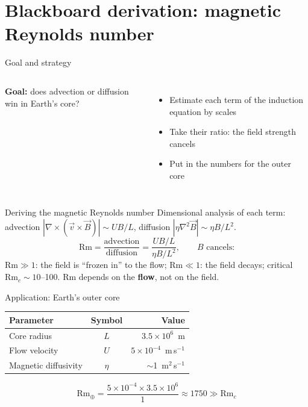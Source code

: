 \documentclass[aspectratio=169, 11pt]{beamer}
\begin{document}
\section{Blackboard derivation: magnetic Reynolds number}

\begin{frame}{Goal and strategy}
  \begin{columns}[c]
    \column{\recapfigcolnarrow}
    \column{\recaptextcolwide}
    \textbf{Goal:} does advection or diffusion win in Earth's core?
    \vskip8pt
    \begin{itemize}\setlength\itemsep{2pt}
      \item Estimate each term of the induction equation by scales
      \item Take their ratio: the field strength cancels
      \item Put in the numbers for the outer core
    \end{itemize}
    \vskip8pt
  \end{columns}
\end{frame}

\begin{frame}{Deriving the magnetic Reynolds number}
  Dimensional analysis of each term: advection $|\nabla \times (\vec{v} \times \vec{B})| \sim UB/L$, diffusion $|\eta \nabla^2 \vec{B}| \sim \eta B/L^2$.
  $$\mathrm{Rm} = \frac{\text{advection}}{\text{diffusion}} = \frac{UB/L}{\eta B/L^2}, \qquad B \text{ cancels:}$$
  \vskip4pt
  $\mathrm{Rm} \gg 1$: the field is ``frozen in'' to the flow; $\mathrm{Rm} \ll 1$: the field decays; critical $\mathrm{Rm}_c \sim 10$--100. Rm depends on the \textbf{flow}, not on the field.
\end{frame}

\begin{frame}{Application: Earth's outer core}
  \centering
  \begin{tabular}{l c r}
    \toprule
    \textbf{Parameter} & \textbf{Symbol} & \textbf{Value} \\
    \midrule
    Core radius & $L$ & $3.5 \times 10^6$~m \\
    Flow velocity & $U$ & $5 \times 10^{-4}$~m\,s$^{-1}$ \\
    Magnetic diffusivity & $\eta$ & $\sim$1~m$^2$\,s$^{-1}$ \\
    \bottomrule
  \end{tabular}
  \vskip10pt
  $$\mathrm{Rm}_\oplus = \frac{5 \times 10^{-4} \times 3.5 \times 10^6}{1} \approx 1750 \gg \mathrm{Rm}_c$$
  \vskip6pt
\end{frame}
\end{document}

